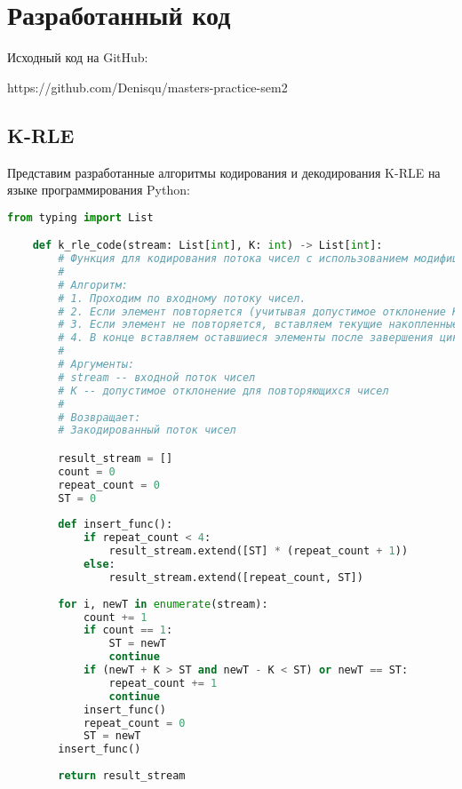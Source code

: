 \chapter{Разработанный код}
\label{ch:chap2}

Исходный код на GitHub:

https://github.com/Denisqu/masters-practice-sem2

\section{K-RLE}

Представим разработанные алгоритмы кодирования и декодирования K-RLE на языке программирования Python:

\begin{lstlisting}[language=python, caption=K-RLE реализация на языке Python, captionpos=b, frame=single]
    from typing import List

    def k_rle_code(stream: List[int], K: int) -> List[int]:
        # Функция для кодирования потока чисел с использованием модифицированного RLE алгоритма.
        # 
        # Алгоритм:
        # 1. Проходим по входному потоку чисел.
        # 2. Если элемент повторяется (учитывая допустимое отклонение K), увеличиваем счетчик повторов.
        # 3. Если элемент не повторяется, вставляем текущие накопленные повторы в результат.
        # 4. В конце вставляем оставшиеся элементы после завершения цикла.
        # 
        # Аргументы:
        # stream -- входной поток чисел
        # K -- допустимое отклонение для повторяющихся чисел
        # 
        # Возвращает:
        # Закодированный поток чисел

        result_stream = []
        count = 0
        repeat_count = 0
        ST = 0
        
        def insert_func():
            if repeat_count < 4:
                result_stream.extend([ST] * (repeat_count + 1))
            else:
                result_stream.extend([repeat_count, ST])
        
        for i, newT in enumerate(stream):
            count += 1
            if count == 1:
                ST = newT
                continue
            if (newT + K > ST and newT - K < ST) or newT == ST:
                repeat_count += 1
                continue
            insert_func()
            repeat_count = 0
            ST = newT
        insert_func()
            
        return result_stream
    

\end{lstlisting}
